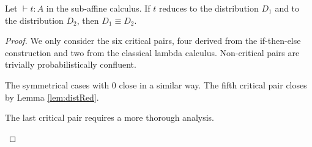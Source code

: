 \begin{thm}\label{thm:confmodulo}
  Let $\vdash t:A$ in the sub-affine calculus.
  If $t$ reduces to the distribution $D_1$ and to the distribution $D_2$, then $D_1\equiv D_2$.
\end{thm}
\begin{proof}
  We only consider the six critical pairs, 
  four derived from the if-then-else construction and two from the classical lambda calculus.
  Non-critical pairs are trivially probabilistically confluent.
\begin{center}
  \hfill
\end{center}


The symmetrical cases with $0$ close in a similar way. 
The fifth critical pair closes by Lemma \ref{lem:distRed}.
\begin{center}
\end{center}

The last critical pair requires a more thorough analysis. 
\begin{center}
\end{center}


\end{proof}
